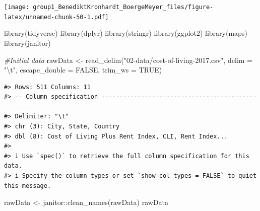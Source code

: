\documentclass[
  11pt,
  a4paper,
  twoside]{scrbook}
\newenvironment{Shaded}{\begin{snugshade}}{\end{snugshade}}
\newcommand{\AttributeTok}[1]{\textcolor[rgb]{0.77,0.63,0.00}{#1}}
\newcommand{\CommentTok}[1]{\textcolor[rgb]{0.56,0.35,0.01}{\textit{#1}}}
\newcommand{\ConstantTok}[1]{\textcolor[rgb]{0.00,0.00,0.00}{#1}}
\newcommand{\FunctionTok}[1]{\textcolor[rgb]{0.00,0.00,0.00}{#1}}
\newcommand{\NormalTok}[1]{#1}
\newcommand{\OtherTok}[1]{\textcolor[rgb]{0.56,0.35,0.01}{#1}}
\newcommand{\SpecialCharTok}[1]{\textcolor[rgb]{0.00,0.00,0.00}{#1}}
\newcommand{\StringTok}[1]{\textcolor[rgb]{0.31,0.60,0.02}{#1}}
\begin{document}
\linespread{1}\texttt{[image: group1\_BenediktKronhardt\_BoergeMeyer\_files/figure-latex/unnamed-chunk-50-1.pdf]}

\linespread{1}

\begin{Shaded}
\begin{Highlighting}[]
\FunctionTok{library}\NormalTok{(tidyverse)}
\FunctionTok{library}\NormalTok{(dplyr)}
\FunctionTok{library}\NormalTok{(stringr)}
\FunctionTok{library}\NormalTok{(ggplot2)}
\FunctionTok{library}\NormalTok{(maps)}
\FunctionTok{library}\NormalTok{(janitor)}

\CommentTok{\#Initial data}
\NormalTok{rawData }\OtherTok{\textless{}{-}} \FunctionTok{read\_delim}\NormalTok{(}\StringTok{"02{-}data/cost{-}of{-}living{-}2017.csv"}\NormalTok{, }
                                  \AttributeTok{delim =} \StringTok{"}\SpecialCharTok{\textbackslash{}t}\StringTok{"}\NormalTok{, }\AttributeTok{escape\_double =} \ConstantTok{FALSE}\NormalTok{, }
                                  \AttributeTok{trim\_ws =} \ConstantTok{TRUE}\NormalTok{)}
\end{Highlighting}
\end{Shaded}

\linespread{1}

\begin{verbatim}
#> Rows: 511 Columns: 11
#> -- Column specification -------------------------------------------------------
#> Delimiter: "\t"
#> chr (3): City, State, Country
#> dbl (8): Cost of Living Plus Rent Index, CLI, Rent Index...
#> 
#> i Use `spec()` to retrieve the full column specification for this data.
#> i Specify the column types or set `show_col_types = FALSE` to quiet this message.
\end{verbatim}

\linespread{1}

\begin{Shaded}
\begin{Highlighting}[]
\NormalTok{rawData }\OtherTok{\textless{}{-}}\NormalTok{ janitor}\SpecialCharTok{::}\FunctionTok{clean\_names}\NormalTok{(rawData)}
\NormalTok{rawData}
\end{Highlighting}
\end{Shaded}

\linespread{1}
\end{document}
